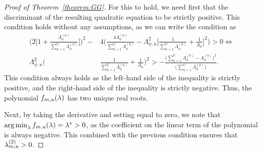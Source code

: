 \begin{proof}[Proof of Theorem~\ref{theorem:GG}]
For this to hold, we need first that the discriminant of the resulting quadratic equation to be strictly positive. 
This condition holds without any assumptions, as we can write the condition as
\begin{align*}
\bigg(2\bigg[ 1 + \frac{\Lambda^{(u)}_{\phi}}{\sum_{k = 1}^U\Lambda^{(k)}_{\phi}}\bigg]\bigg)^2 - &4\bigg(\frac{4\Lambda^{(u)}_{\phi}}{\sum_{k = 1}^U\Lambda^{(k)}_{\phi}} - \Lambda_{\phi, u}^2\bigg[\frac{1}{\sum_{k = 1}^U\Lambda^{(k)}_{\phi}} + \frac{1}{\Lambda_u}\bigg]^2\bigg) > 0 \iff \\
\Lambda^{2}_{\phi, u}\bigg(&\frac{1}{\sum_{k = 1}^U \Lambda_{\phi}^{(k)}} + \frac{1}{\Lambda_u}\bigg)^2 > -\frac{\big(\sum_{k = 1}^U \Lambda_{\phi}^{(k)} - \Lambda_\phi^{(u)}\big)^2}{\big(\sum_{k = 1}^U \Lambda_{\phi}^{(k)}\big)}.
\end{align*}
This condition always holds as the left-hand side of the inequality is strictly positive, and the right-hand side of the inequality is strictly negative. 
Thus, the polynomial $f_{m, u}(\lambda)$ has two unique real roots. 

Next, by taking the derivative and setting equal to zero, we note that $\operatorname*{arg\,min}_\lambda f_{m, u}(\lambda) = \lambda^* > 0$, as the coefficient on the linear term of the polynomial is always negative.
This combined with the previous condition ensures that $\lambda^{(2)}_{m, u} > 0$. 


\end{proof}
